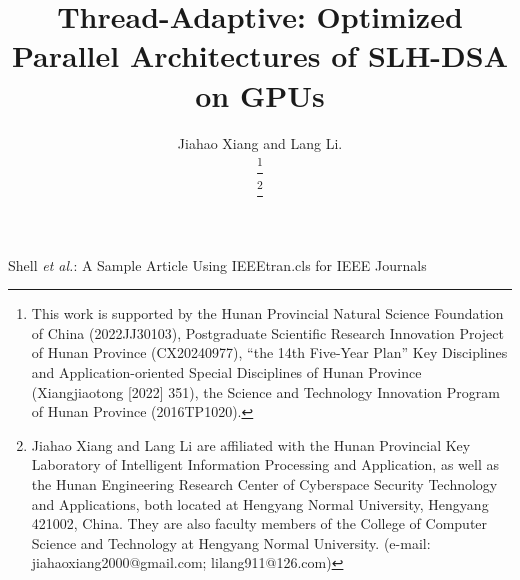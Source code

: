 \documentclass[journal]{IEEEtran}
\begin{document}
\title{Thread-Adaptive: Optimized Parallel Architectures of SLH-DSA on GPUs}

\author{Jiahao Xiang and Lang Li.

  \thanks{This work is supported by the Hunan Provincial Natural Science Foundation of China (2022JJ30103), Postgraduate Scientific Research Innovation Project of Hunan Province (CX20240977), “the 14th Five-Year Plan” Key Disciplines and Application-oriented Special Disciplines of Hunan Province (Xiangjiaotong [2022] 351), the Science and Technology Innovation Program of Hunan Province (2016TP1020).}

  \thanks{Jiahao Xiang and Lang Li are affiliated with the Hunan Provincial Key Laboratory of Intelligent Information Processing and Application, as well as the Hunan Engineering Research Center of Cyberspace Security Technology and Applications, both located at Hengyang Normal University, Hengyang 421002, China. They are also faculty members of the College of Computer Science and Technology at Hengyang Normal University. (e-mail: jiahaoxiang2000@gmail.com; lilang911@126.com)}%
}

%
{Shell \MakeLowercase{\textit{et al.}}: A Sample Article Using IEEEtran.cls for IEEE Journals}

\IEEEpubid{}
\end{document}
